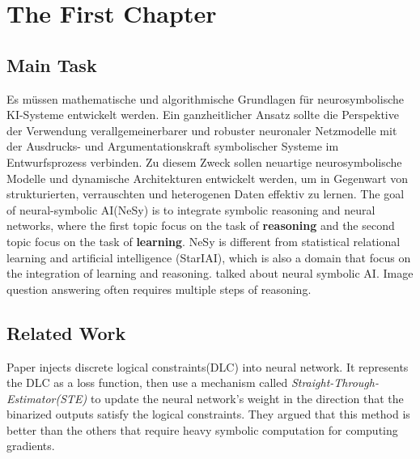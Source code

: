 \chapter{The First Chapter}



\section{Main Task}
Es müssen mathematische und algorithmische Grundlagen für neurosymbolische KI-Systeme entwickelt werden.
Ein ganzheitlicher Ansatz sollte die Perspektive der Verwendung verallgemeinerbarer und robuster neuronaler Netzmodelle mit der Ausdrucks- und Argumentationskraft symbolischer Systeme im Entwurfsprozess verbinden. Zu diesem Zweck sollen neuartige neurosymbolische Modelle und dynamische Architekturen entwickelt werden, um in Gegenwart von strukturierten, verrauschten und heterogenen Daten effektiv zu lernen.
The goal of neural-symbolic AI(NeSy) is to integrate symbolic reasoning and neural networks, where the first topic focus on the task of \textbf{reasoning} and the second topic focus on the task of \textbf{learning}. 
NeSy is different from statistical relational learning and artificial intelligence (StarIAI),
which is also a domain that focus on the integration of learning and reasoning.\cite{Susskind2021} talked about neural symbolic AI.
Image question answering often requires multiple steps of reasoning.\cite{SAN}


\section{Related Work}
Paper\cite{yang22} injects discrete logical constraints(DLC) into neural network.
It represents the DLC as a loss function, then use a mechanism called \textit{Straight-Through-Estimator(STE)} to update the neural network's weight in the direction that the binarized outputs satisfy the logical constraints. They argued that this method is better than the others that require heavy symbolic computation for computing gradients.



